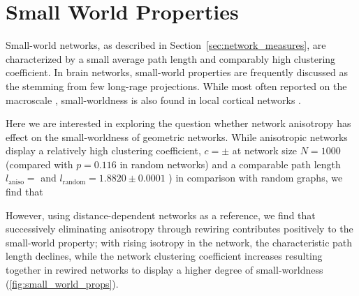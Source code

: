 

\newpage
\section{Small World Properties}\label{sec:small_world}

Small-world networks, as described in
Section~\ref{sec:network_measures}, are characterized by a small
average path length and comparably high clustering coefficient. In
brain networks, small-world properties are frequently discussed as the
stemming from few long-rage projections. While most often
reported on the macroscale \parencite{SpornsZwi2004}, small-worldness
is also found in local cortical networks \parencite{Perin2011}.

Here we are interested in exploring the question whether network
an\-iso\-tropy has effect on the small-worldness of geometric
networks. While anisotropic networks display a relatively high
clustering coefficient, $c = \pm $ at network size $N=1000$ (compared
with $p = 0.116$ in random networks) and a comparable path length
$l_{\mathrm{aniso}} = $ and $l_{\mathrm{random}} = 1.8820 \pm 0.0001$
) in comparison with random graphs, we find that 

However, using distance-dependent networks as a reference, we find
that successively eliminating anisotropy through rewiring contributes
positively to the small-world property; with rising isotropy in the
network, the characteristic path length declines, while the network
clustering coefficient increases resulting together in rewired
networks to display a higher degree of small-worldness
(\autoref{fig:small_world_props}).


